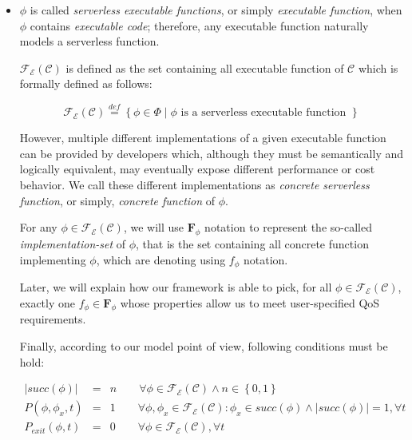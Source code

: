 \documentclass[12pt,a4paper]{report}
\newcommand{\mathDef}{\overset{\textit{def}}{=}}
\begin{document}
\begin{itemize}
	
	\item $\phi$ is called \textit{serverless executable functions}, or simply \textit{executable function}, when $\phi$ contains \textit{executable code}; therefore, any executable function naturally models a serverless function.
	
	$\mathscr{F_E}(\mathcal{C})$ is defined as the set containing all executable function of $\mathcal{C}$ which is formally defined as follows:
	
	\begin{equation}
		\mathscr{F_E(\mathcal{C})} \mathDef \left\lbrace \phi \in \Phi \mid \phi \text{ is a serverless executable function }\right\rbrace 
	\end{equation}
	
	However, multiple different implementations of a given executable function can be provided by developers which, although they must be semantically and logically equivalent, may eventually expose different performance or cost behavior. We call these different implementations as \textit{concrete serverless function}, or simply, \textit{concrete function} of $\phi$.
	
	For any $\phi \in \mathscr{F_E}(\mathcal{C})$, we will use $\textbf{F}_{\phi}$ notation to represent the so-called \textit{implementation-set} of $\phi$, that is the set containing all concrete function implementing $\phi$, which are denoting using $f_{\phi}$ notation. 

	Later, we will explain how our framework is able to pick, for all $\phi \in \mathscr{F_E}(\mathcal{C})$, exactly one $f_{\phi} \in \textbf{F}_{\phi}$ whose properties allow us to meet user-specified QoS requirements.
	
	Finally, according to our model point of view, following conditions must be hold: 
	
	\begin{eqnarray}
		|succ(\phi)| & = & n \qquad \forall \phi \in \mathscr{F_E}(\mathcal{C}) \label{eq:executableFP1} \wedge n \in \left\{0,1\right\} \\
		P(\phi, \phi_x,t) & = & 1 \qquad \forall \phi, \phi_x \in \mathscr{F_E}(\mathcal{C}) : \phi_x \in succ(\phi) \wedge |succ(\phi)| = 1, \forall t \qquad \qquad \label{eq:executableFP2} \\
		P_{exit}(\phi, t) & = & 0 \qquad \forall \phi \in \mathscr{F_E}(\mathcal{C}), \forall t
	\end{eqnarray}



\end{itemize}
\end{document}
